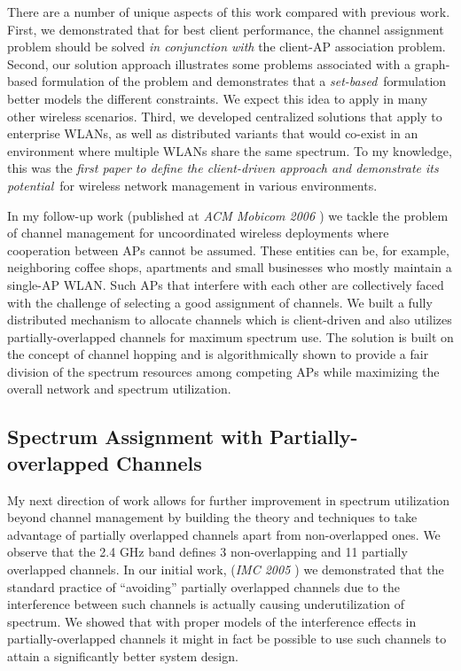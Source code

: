 \documentclass[11pt,letterpaper]{article}
\begin{document}
There are a number of unique aspects of this work compared with previous work.  First, we demonstrated that for best
client performance, the channel assignment problem should be solved {\em in conjunction with} the client-AP association
problem.  Second, our solution approach illustrates some problems associated with a graph-based formulation of the
problem and demonstrates that a {\em set-based}\ formulation better models the different constraints. We expect this
idea to apply in many other wireless scenarios.  Third, we developed centralized solutions that apply to enterprise
WLANs, as well as distributed variants that would co-exist in an environment where multiple WLANs share the same
spectrum. To my knowledge, this was the {\em first paper to define the client-driven approach and demonstrate its
potential}\ for wireless network management in various environments.

In my follow-up work (published at {\it ACM Mobicom 2006 \cite{mobicom2006}}) we tackle the problem of channel
management for  uncoordinated wireless deployments where cooperation between APs cannot be assumed. These entities can
be, for example, neighboring coffee shops, apartments and small businesses who mostly maintain a single-AP WLAN. Such
APs that interfere with each other are collectively faced with the challenge of selecting a good assignment of channels.
We built a fully distributed mechanism to allocate channels which is client-driven and also utilizes
partially-overlapped channels for maximum spectrum use. The solution is built on the concept of channel hopping and is
algorithmically shown to provide a fair division of the spectrum resources among competing APs while maximizing the
overall network and spectrum utilization.

\subsection*{Spectrum Assignment with Partially-overlapped Channels} My next direction of work allows for further
improvement in spectrum utilization beyond channel management by building the theory and techniques to take advantage of
partially overlapped channels apart from non-overlapped ones.  We observe that the 2.4 GHz band defines 3
non-overlapping and 11 partially overlapped channels. In our initial work, ({\it IMC 2005 \cite{pov}}) we demonstrated that the
standard practice of ``avoiding'' partially overlapped channels due to the interference between such channels is
actually causing underutilization of spectrum.  We showed that with proper models of the interference effects in
partially-overlapped channels it might in fact be possible to use such channels to attain a significantly better system
design.
\end{document}

